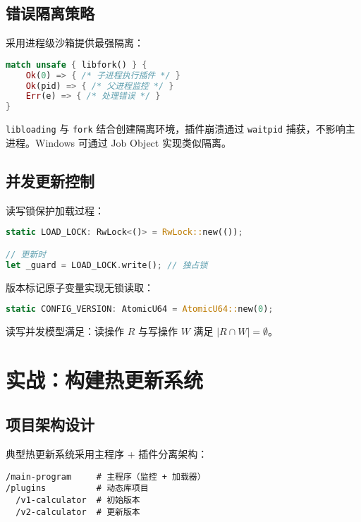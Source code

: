 \section{错误隔离策略}
采用进程级沙箱提供最强隔离：\par
\begin{lstlisting}[language=rust]
match unsafe { libfork() } {
    Ok(0) => { /* 子进程执行插件 */ }
    Ok(pid) => { /* 父进程监控 */ }
    Err(e) => { /* 处理错误 */ }
}
\end{lstlisting}
\texttt{libloading} 与 \texttt{fork} 结合创建隔离环境，插件崩溃通过 \texttt{waitpid} 捕获，不影响主进程。Windows 可通过 Job Object 实现类似隔离。\par
\section{并发更新控制}
读写锁保护加载过程：\par
\begin{lstlisting}[language=rust]
static LOAD_LOCK: RwLock<()> = RwLock::new(());

// 更新时
let _guard = LOAD_LOCK.write(); // 独占锁
\end{lstlisting}
版本标记原子变量实现无锁读取：\par
\begin{lstlisting}[language=rust]
static CONFIG_VERSION: AtomicU64 = AtomicU64::new(0);
\end{lstlisting}
读写并发模型满足：读操作 $R$ 与写操作 $W$ 满足 $|R \cap W| = \emptyset$。\par
\chapter{实战：构建热更新系统}
\section{项目架构设计}
典型热更新系统采用主程序 + 插件分离架构：\par
\begin{lstlisting}
/main-program     # 主程序（监控 + 加载器）
/plugins          # 动态库项目
  /v1-calculator  # 初始版本
  /v2-calculator  # 更新版本
\end{lstlisting}
